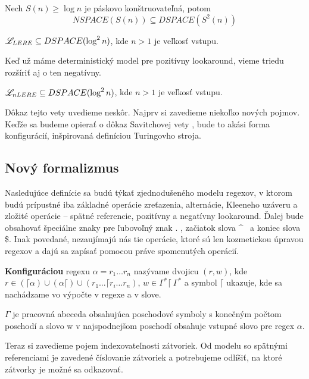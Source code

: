 \begin{veta}
Nech $S(n)\geq \log n$ je páskovo konštruovateľná, potom 
$$ NSPACE(S(n)) \subseteq DSPACE(S^2(n)) $$
\end{veta}

\begin{dosledok}\label{le_dspace_log2n}
$\mathscr{L}_{LERE} \subseteq DSPACE(\log^2 n)$, kde $n>1$ je veľkosť vstupu.
\end{dosledok}

Keď už máme deterministický model pre pozitívny lookaround, vieme triedu rozšíriť aj o ten negatívny.
\begin{veta}\label{dspace_log2n}
$\mathscr{L}_{nLERE} \subseteq DSPACE(\log^2 n)$, kde $n>1$ je veľkosť vstupu.
\end{veta}
Dôkaz tejto vety uvedieme neskôr. Najprv si zavedieme niekoľko nových pojmov. Keďže sa budeme opierať o dôkaz Savitchovej vety \cite{Savitch_skripta}, bude to akási forma konfigurácií, inšpirovaná definíciou Turingovho stroja.

\subsection{Nový formalizmus}\label{novy_formalizmus}

Nasledujúce definície sa budú týkať zjednodušeného modelu regexov, v ktorom budú prípustné iba základné operácie zreťazenia, alternácie, Kleeneho uzáveru a zložité operácie -- spätné referencie, pozitívny a negatívny lookaround. Ďalej bude obsahovať špeciálne znaky pre ľubovoľný znak . , začiatok slova \textasciicircum~ a koniec slova \$. Inak povedané, nezaujímajú nás tie operácie, ktoré sú len kozmetickou úpravou regexov a dajú sa zapísať pomocou práve spomenutých operácií.

\begin{df}\label{def_konfiguracia}
\textbf{Konfiguráciou} regexu $\alpha = r_1 \dots r_n$ nazývame dvojicu $(r, w)$, kde $r \in (\lceil\alpha)\cup(\alpha\lceil)\cup(r_1 \dots \lceil r_i \dots r_n)$, $w \in \Gamma^*\lceil~ \Gamma^*$ a symbol $\lceil$ ukazuje, kde sa nachádzame vo výpočte v regexe a v slove.

$\Gamma$ je pracovná abeceda obsahujúca poschodové symboly s konečným počtom poschodí a slovo w v najspodnejšom poschodí obsahuje vstupné slovo pre regex $\alpha$.
\end{df}

Teraz si zavedieme pojem indexovateľnosti zátvoriek. Od modelu so spätnými referenciami je zavedené číslovanie zátvoriek a potrebujeme odlíšiť, na ktoré zátvorky je možné sa odkazovať.

